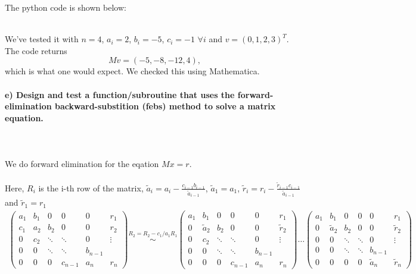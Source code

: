     The python code is shown below:
    
    \ \\
    We've tested it with $n=4$, $a_i = 2$, $b_i = -5$,
    $c_i = -1$ $ \forall i$ and $v = (0,1,2,3)^T$. The code returns
    \begin{equation}
    	Mv = (-5, -8, -12, 4),
    \end{equation}
    which is what one would expect. We checked this using Mathematica. \\

\newpage
\paragraph{
    e) Design and test a function/subroutine that uses the
    forward-elimination backward-substition (febs) method to solve a 
    matrix equation.
} \ \\
    \\
    We do forward elimination for the eqation $Mx = r$. \\
    \\
    Here, $R_i$ is the i-th row of the matrix,
    $\tilde{a}_i = a_i - \frac{c_{i-1} b_{i-1}}{\tilde{a}_{i-1}}$,
    $\tilde{a}_1 = a_1$,
    $\tilde{r}_i = r_i - \frac{\tilde{r}_{i-1} c_{i-1}}{\tilde{a}_{i-1}}$ and
    $\tilde{r}_1 = r_1$ \\
    \begin{align}
	\begin{pmatrix}
	a_1 & b_1 & 0      & 0       & 0   & r_1\\
	c_1 & a_2 & b_2    & 0       & 0 & r_2\\
	0   & c_2 & \ddots & \ddots  & 0 & \vdots\\
	0   & 0   & \ddots & \ddots  & b_{n-1} &\\
	0   & 0   & 0      & c_{n-1} & a_n& r_n
	\end{pmatrix}
	\overset{R_2 = R_2 - c_1/a_1 R_1}{\sim}
	\begin{pmatrix}
	a_1 & b_1 & 0      & 0       & 0   & r_1\\
	0 & \tilde{a}_2 & b_2    & 0       & 0 & \tilde{r}_2\\
	0   & c_2 & \ddots & \ddots  & 0 & \vdots\\
	0   & 0   & \ddots & \ddots  & b_{n-1} &\\
	0   & 0   & 0      & c_{n-1} & a_n& r_n
	\end{pmatrix}
	\dots
	\begin{pmatrix}
	a_1 & b_1 & 0      & 0       & 0   & r_1\\
	0 & \tilde{a}_2 & b_2    & 0       & 0 & \tilde{r}_2\\
	0   & 0 & \ddots & \ddots  & 0 & \vdots\\
	0   & 0   & \ddots & \ddots  & b_{n-1} &\\
	0   & 0   & 0      & 0 & \tilde{a}_n& \tilde{r}_n
	\end{pmatrix}
    \end{align}
